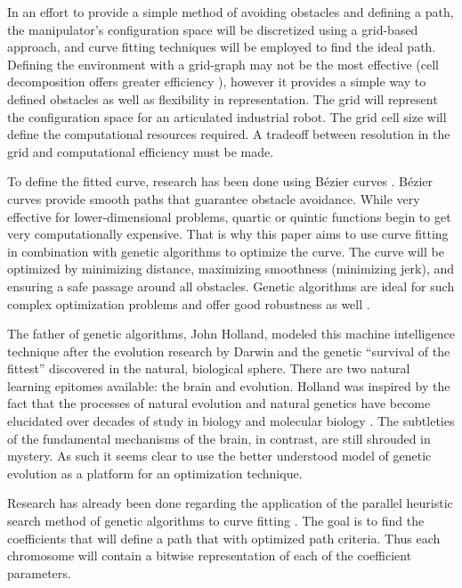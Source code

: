 \documentclass[twoside]{article}
\begin{document}
\begin{multicols}{2}
In an effort to provide a simple method of avoiding obstacles and defining a path, the manipulator’s configuration space will be discretized using a grid-based approach, and curve fitting techniques will be employed to find the ideal path. Defining the environment with a grid-graph may not be the most effective (cell decomposition offers greater efficiency \cite{lingelbach04}), however it provides a simple way to defined obstacles as well as flexibility in representation. The grid will represent the configuration space for an articulated industrial robot. The grid cell size will define the computational resources required. A tradeoff between resolution in the grid and computational efficiency must be made.

To define the fitted curve, research has been done using Bézier curves \cite{choi10}. Bézier curves provide smooth paths that guarantee obstacle avoidance. While very effective for lower-dimensional problems, quartic or quintic functions begin to get very computationally expensive. That is why this paper aims to use curve fitting in combination with genetic algorithms to optimize the curve. The curve will be optimized by minimizing distance, maximizing smoothness (minimizing jerk), and ensuring a safe passage around all obstacles. Genetic algorithms are ideal for such complex optimization problems and offer good robustness as well \cite{zou12}.

The father of genetic algorithms, John Holland, modeled this machine intelligence technique after the evolution research by Darwin and the genetic “survival of the fittest” discovered in the natural, biological sphere. There are two natural learning epitomes available: the brain and evolution. Holland was inspired by the fact that the processes of natural evolution and natural genetics have become elucidated over decades of study in biology and molecular biology \cite{goldberg88}. The subtleties of the fundamental mechanisms of the brain, in contrast, are still shrouded in mystery. As such it seems clear to use the better understood model of genetic evolution as a platform for an optimization technique.

Research has already been done regarding the application of the parallel heuristic search method of genetic algorithms to curve fitting \cite{gulsen95,karr91,ismail08}. The goal is to find the coefficients that will define a path that with optimized path criteria. Thus each chromosome will contain a bitwise representation of each of the coefficient parameters.


\end{multicols}
\end{document}
